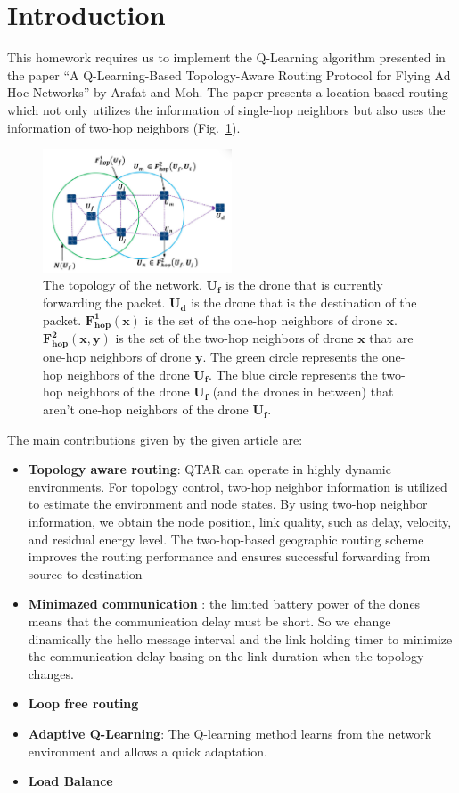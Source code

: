 \section{Introduction}
This homework requires us to implement the Q-Learning algorithm presented in
the paper ``A Q-Learning-Based Topology-Aware Routing Protocol for
Flying Ad Hoc Networks''  by Arafat and Moh.
The paper presents a location-based routing which not only utilizes
the information of single-hop neighbors but also uses the information
of two-hop neighbors (Fig.~\ref{fig:topology}).

\begin{figure}[h]
    \centering
    \includegraphics[width=0.5\textwidth]{Figures/paper-fig-6.png}
    \caption{
        The topology of the network.
        $\mathbf{U_f}$ is the drone that is currently forwarding the packet.
        $\mathbf{U_d}$ is the drone that is the destination of the packet.
        $\mathbf{F^1_{hop}(x)}$ is the set of the one-hop neighbors of drone $\mathbf{x}$.
        $\mathbf{F^2_{hop}(x, y)}$ is the set of the two-hop neighbors of drone $\mathbf{x}$ that are one-hop neighbors of drone $\mathbf{y}$.
        The green circle represents the one-hop neighbors of the drone $\mathbf{U_f}$.
        The blue circle represents the two-hop neighbors of the drone $\mathbf{U_f}$ (and the drones in between) that aren't one-hop neighbors of the drone $\mathbf{U_f}$.
    }\label{fig:topology}
\end{figure}

The main contributions given by the given article are:
\begin{itemize}
    \item \textbf{Topology aware routing}: QTAR can operate in highly dynamic environments. For
    topology control, two-hop neighbor information is utilized to estimate the environment and node states. By
    using two-hop neighbor information, we obtain the node
    position, link quality, such as delay, velocity, and residual energy level. The two-hop-based geographic routing
    scheme improves the routing performance and ensures
    successful forwarding from source to destination
    \item \textbf{Minimazed communication }: the limited battery power of the dones means that the communication delay must be short. So we change dinamically the hello message interval and the link holding timer to minimize the communication delay basing on the link duration when the topology changes.
    \item \textbf{Loop free routing}
    \item \textbf{Adaptive Q-Learning}: The Q-learning method learns from
    the network environment and allows a quick adaptation.
    \item \textbf{Load Balance}
\end{itemize}